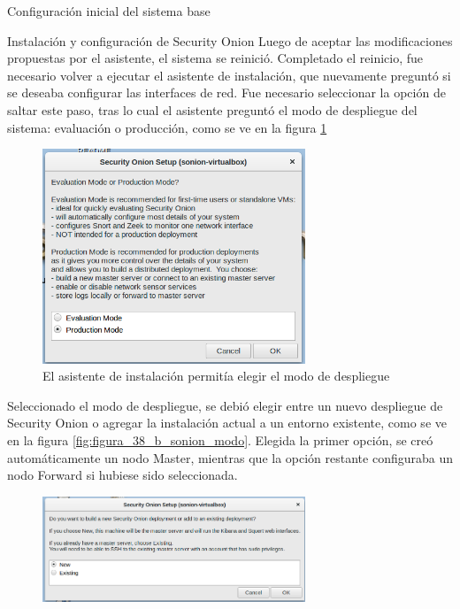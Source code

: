 \begin{section}{Configuración inicial del sistema base}
\begin{subsection}{Instalación y configuración de Security Onion}
        Luego de aceptar las modificaciones propuestas por el asistente, el sistema se reinició. Completado el reinicio, fue necesario volver a ejecutar el asistente de instalación, que nuevamente preguntó si se deseaba configurar las interfaces de red. Fue necesario seleccionar la opción de saltar este paso, tras lo cual el asistente preguntó el modo de despliegue del sistema: evaluación o producción, como se ve en la figura \ref{fig:figura_38_sonion_modo}
        \begin{figure}[H]
            \centering
            \includegraphics[width=0.7\textwidth]{./iteracion_1_imagenes/figura_38_sonion_modo.png}
            \caption{El asistente de instalación permitía elegir el modo de despliegue}
            \label{fig:figura_38_sonion_modo}
        \end{figure}
        \FloatBarrier
        Seleccionado el modo de despliegue, se debió elegir entre un nuevo despliegue de Security Onion o agregar la instalación actual a un entorno existente, como se ve en la figura \ref{fig:figura_38_b_sonion_modo}. Elegida la primer opción, se creó automáticamente un nodo Master, mientras que la opción restante configuraba un nodo Forward si hubiese sido seleccionada. \par
        \begin{figure}[H]
            \centering
            \includegraphics[width=0.7\textwidth]{./iteracion_1_imagenes/figura_38_b_sonion_modo.png}

\end{figure}
\end{subsection}
\end{section}
